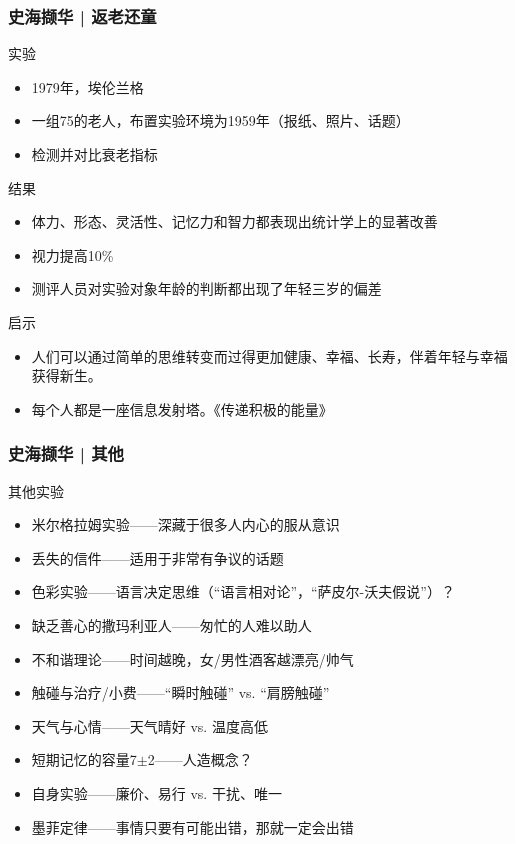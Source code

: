 \begin{frame}
  \frametitle{史海撷华 | 返老还童}
  \begin{block}{实验}
    \begin{itemize}
      \item 1979年，埃伦\textbullet 兰格
      \item 一组75的老人，布置实验环境为1959年（报纸、照片、话题）
      \item 检测并对比衰老指标
    \end{itemize}
  \end{block}
  \pause
  \begin{block}{结果}
    \begin{itemize}
      \item 体力、形态、灵活性、记忆力和智力都表现出统计学上的显著改善
      \item 视力提高10\%
      \item 测评人员对实验对象年龄的判断都出现了年轻三岁的偏差
    \end{itemize}
  \end{block}
  \pause
  \begin{block}{启示}
    \begin{itemize}
      \item 人们可以通过简单的思维转变而过得更加健康、幸福、长寿，伴着年轻与幸福获得新生。
      \item 每个人都是一座信息发射塔。《传递积极的能量》
    \end{itemize}
  \end{block}
\end{frame}

\begin{frame}
  \frametitle{史海撷华 | 其他}
  \begin{block}{其他实验}
    \begin{itemize}
      \item 米尔格拉姆实验——深藏于很多人内心的服从意识
      \item 丢失的信件——适用于非常有争议的话题
      \item 色彩实验——语言决定思维（“语言相对论”，“萨皮尔-沃夫假说”）？
      \item 缺乏善心的撒玛利亚人——匆忙的人难以助人
      \item 不和谐理论——时间越晚，女/男性酒客越漂亮/帅气
      \item 触碰与治疗/小费——“瞬时触碰” vs. “肩膀触碰”
      \item 天气与心情——天气晴好 vs. 温度高低
      \item 短期记忆的容量7$\pm$2——人造概念？
      \item 自身实验——廉价、易行 vs. 干扰、唯一
      \item 墨菲定律——事情只要有可能出错，那就一定会出错
    \end{itemize}
  \end{block}
\end{frame}


